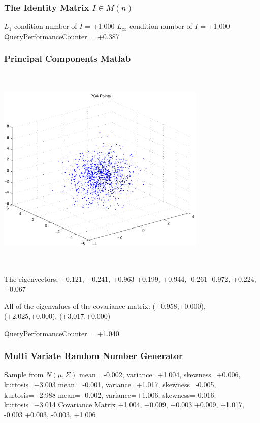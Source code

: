 \documentclass[9pt]{article}
\theoremstyle{plain}
\theoremstyle{definition}
\theoremstyle{remark}
\numberwithin{equation}{section}
\begin{document}
\subsubsection{The Identity Matrix $I \in M(n)$}
$L_1$ condition number of $I$ = +1.000
$L_\infty$ condition number of $I$ = +1.000
QueryPerformanceCounter  =  +0.387
\subsubsection{Principal Components Matlab }
\includegraphics[width=10.0cm,height=10.0cm]{PCAPoints.pdf}

The eigenvectors:
+0.121, +0.241, +0.963
+0.199, +0.944, -0.261
-0.972, +0.224, +0.067

All of the eigenvalues of the covariance matrix:
(+0.958,+0.000), (+2.025,+0.000), (+3.017,+0.000)

QueryPerformanceCounter  =  +1.040
\subsubsection{Multi Variate Random Number Generator }
Sample from $N(\mu,\Sigma)$
mean= -0.002, variance=+1.004, skewness=+0.006, kurtosis=+3.003
mean= -0.001, variance=+1.017, skewness=-0.005, kurtosis=+2.988
mean= -0.002, variance=+1.006, skewness=-0.016, kurtosis=+3.014
Covariance Matrix 
+1.004, +0.009, +0.003
+0.009, +1.017, -0.003
+0.003, -0.003, +1.006
\end{document}
